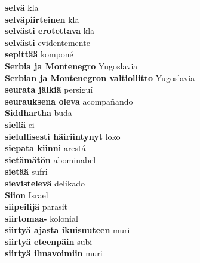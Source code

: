 \textbf{ selvä  } kla \\
\textbf{ selväpiirteinen  } kla \\
\textbf{ selvästi erotettava  } kla \\
\textbf{ selvästi  } evidentemente \\
\textbf{ sepittää  } komponé \\
\textbf{ Serbia ja Montenegro  } Yugoslavia \\
\textbf{ Serbian ja Montenegron valtioliitto  } Yugoslavia \\
\textbf{ seurata jälkiä  } persiguí \\
\textbf{ seurauksena oleva  } acompañando \\
\textbf{ Siddhartha  } buda \\
\textbf{ siellä  } ei \\
\textbf{ sielullisesti häiriintynyt  } loko \\
\textbf{ siepata kiinni  } arestá \\
\textbf{ sietämätön  } abominabel \\
\textbf{ sietää  } sufri \\
\textbf{ sievistelevä  } delikado \\
\textbf{ Siion  } Israel \\
\textbf{ siipeilijä  } parasit \\
\textbf{ siirtomaa-  } kolonial \\
\textbf{ siirtyä ajasta ikuisuuteen  } muri \\
\textbf{ siirtyä eteenpäin  } subi \\
\textbf{ siirtyä ilmavoimiin  } muri \\
